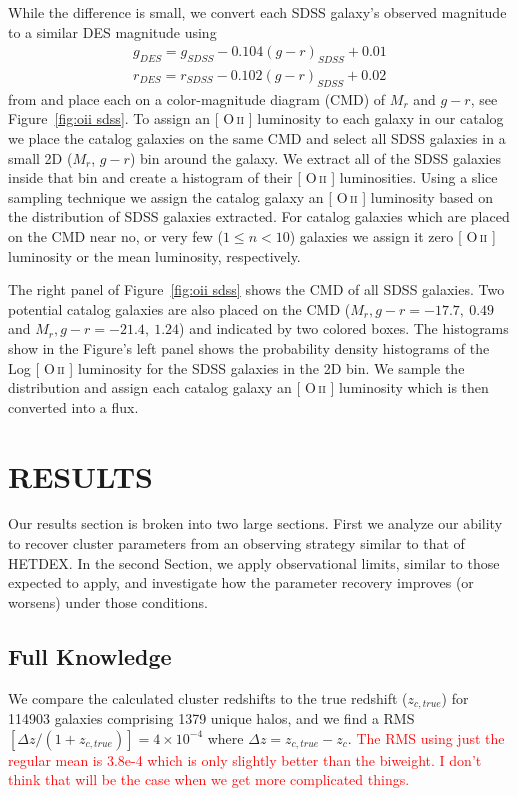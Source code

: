 \documentclass[apj, revtex4]{emulateapj}
\makeatletter
\newcommand{\editorial}[1]{\textcolor{red}{#1}}
\DeclareRobustCommand{\ion}[2]{%
\relax\ifmmode
\ifx\testbx\f@series
{\mathbf{#1\,\mathsc{#2}}}\else
{\mathrm{#1\,\mathsc{#2}}}\fi
\else\textup{#1\,{\mdseries\textsc{#2}}}%
\fi}
\makeatother
\begin{document}
While the difference is small, we convert each SDSS galaxy's observed magnitude to a similar DES magnitude using
\begin{eqnarray}
	g_{DES} = g_{SDSS} - 0.104(g-r)_{SDSS} + 0.01 \\
	r_{DES} = r_{SDSS} - 0.102(g-r)_{SDSS} + 0.02
\end{eqnarray}
from \cite{Bechtol2015} and place each on a color-magnitude diagram (CMD) of $M_r$ and $g-r$, see Figure~\ref{fig:oii sdss}. To assign an [\ion{O}{ii}] luminosity to each galaxy in our catalog we place the catalog galaxies on the same CMD and select all SDSS galaxies in a small 2D ($M_r$, $g-r$) bin around the galaxy. We extract all of the SDSS galaxies inside that bin and create a histogram of their [\ion{O}{ii}] luminosities. Using a slice sampling technique \citep{Neal1997} we assign the catalog galaxy an [\ion{O}{ii}] luminosity based on the distribution of SDSS galaxies extracted. For catalog galaxies which are placed on the CMD near no, or very few ($1\leq n<10$) galaxies we assign it zero [\ion{O}{ii}] luminosity or the mean luminosity, respectively.

The right panel of Figure~\ref{fig:oii sdss} shows the CMD of all SDSS galaxies. Two potential catalog galaxies are also placed on the CMD ($M_r, g-r = -17.7,~0.49$ and $M_r, g-r = -21.4,~1.24$) and indicated by two colored boxes. The histograms show in the Figure's left panel shows the probability density histograms of the Log [\ion{O}{ii}] luminosity for the SDSS galaxies in the 2D bin. We sample the distribution and assign each catalog galaxy an [\ion{O}{ii}] luminosity which is then converted into a flux. 

\section{RESULTS}
Our results section is broken into two large sections. First we analyze our ability to recover cluster parameters from an observing strategy similar to that of HETDEX. In the second Section, we apply observational limits, similar to those expected to apply, and investigate how the parameter recovery improves (or worsens) under those conditions. 

\subsection{Full Knowledge}
We compare the calculated cluster redshifts to the true redshift ($z_{c,true}$) for 114903 galaxies comprising 1379 unique halos, and we find a RMS$[\Delta z/(1+z_{c,true})]= 4\times 10^{-4}$ where $\Delta z = z_{c,true} - z_{c}$. \editorial{The RMS using just the regular mean is 3.8e-4 which is only slightly better than the biweight. I don't think that will be the case when we get more complicated things.}
\end{document}
